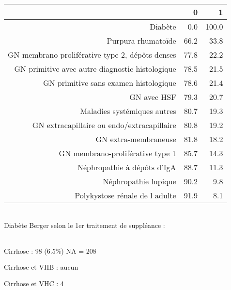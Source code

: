 \documentclass[11pt,a4paper]{article}\usepackage[]{graphicx}\usepackage[]{color}
\begin{document}
\begin{table}[H]
\centering
\begin{tabular}{rrr}
  \hline
 & 0 & 1 \\ 
  \hline
Diabète & 0.0 & 100.0 \\ 
  Purpura rhumatoïde & 66.2 & 33.8 \\ 
  GN membrano-proliférative type 2, dépôts denses & 77.8 & 22.2 \\ 
  GN primitive avec autre diagnostic histologique & 78.5 & 21.5 \\ 
  GN primitive sans examen histologique & 78.6 & 21.4 \\ 
  GN avec HSF & 79.3 & 20.7 \\ 
  Maladies systémiques autres & 80.7 & 19.3 \\ 
  GN extracapillaire ou endo/extracapillaire & 80.8 & 19.2 \\ 
  GN extra-membraneuse & 81.8 & 18.2 \\ 
  GN membrano-proliférative type 1 & 85.7 & 14.3 \\ 
  Néphropathie à dépôts d'IgA & 88.7 & 11.3 \\ 
  Néphropathie lupique & 90.2 & 9.8 \\ 
  Polykystose rénale de l adulte & 91.9 & 8.1 \\ 
   \hline
\end{tabular}
\end{table}

% 
% 
% 
% 
% 
~\\

Diabète Berger selon le 1er traitement de suppléance :


~\\

Cirrhose : 98 (6.5\%) NA = 208

Cirrhose et VHB : aucun

Cirrhose et VHC : 4
\end{document}
